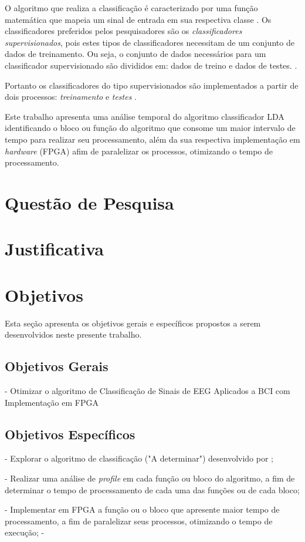 O algoritmo que realiza a classificação é caracterizado por uma função matemática que mapeia um sinal de entrada em sua respectiva classe \cite{lottephd}. Os classificadores preferidos pelos pesquisadores são os \textit{classificadores supervisionados}, pois estes tipos de classificadores necessitam de um conjunto de dados de treinamento. Ou seja, o conjunto de dados necessários para um classificador supervisionado são divididos em: dados de treino e dados de testes. \cite{Siulybook}.

Portanto os classificadores do tipo supervisionados são implementados a partir de dois processos: \textit{treinamento} e \textit{testes} \cite{Siulybook}.



Este trabalho apresenta uma análise temporal do algoritmo classificador LDA identificando o bloco ou função do algoritmo que consome um maior intervalo de tempo para realizar seu processamento, além da sua respectiva implementação em \textit{hardware} (FPGA) afim de paralelizar os processos, otimizando o tempo de processamento.

\section{Questão de Pesquisa}
\section{Justificativa}
\section{Objetivos}
Esta seção apresenta os objetivos gerais e específicos propostos a serem desenvolvidos neste presente trabalho.
\subsection{Objetivos Gerais}
- Otimizar o algoritmo de Classificação de Sinais de EEG Aplicados a BCI com Implementação em FPGA
\subsection{Objetivos Específicos}
- Explorar o algoritmo de classificação ("A determinar") desenvolvido por \cite{F.Lotte};

- Realizar uma análise de \textit{profile} em cada função ou bloco do algoritmo, a fim de determinar o tempo de processamento de cada uma das funções ou de cada bloco; 

- Implementar em FPGA a função ou o bloco que apresente maior tempo de processamento, a fim de paralelizar seus processos, otimizando o tempo de execução;
- 
